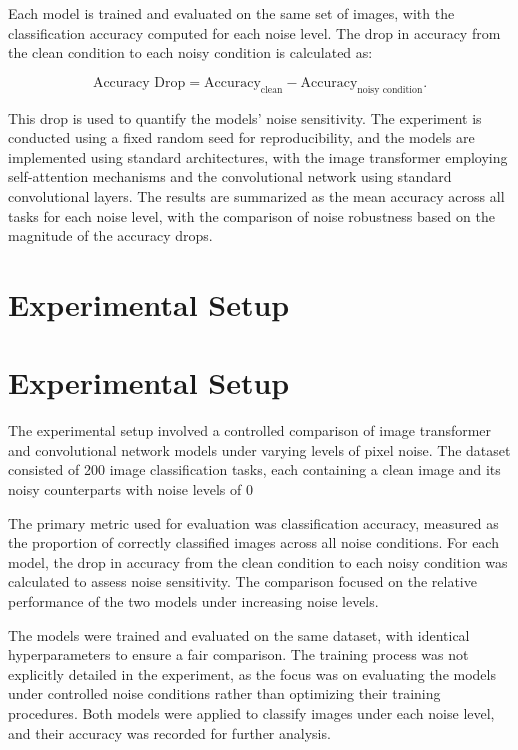 \documentclass{article}
\begin{document}
Each model is trained and evaluated on the same set of images, with the classification accuracy computed for each noise level. The drop in accuracy from the clean condition to each noisy condition is calculated as:

$$
\text{Accuracy Drop} = \text{Accuracy}_{\text{clean}} - \text{Accuracy}_{\text{noisy condition}}.
$$

This drop is used to quantify the models' noise sensitivity. The experiment is conducted using a fixed random seed for reproducibility, and the models are implemented using standard architectures, with the image transformer employing self-attention mechanisms and the convolutional network using standard convolutional layers. The results are summarized as the mean accuracy across all tasks for each noise level, with the comparison of noise robustness based on the magnitude of the accuracy drops.
\section{Experimental Setup}
\section{Experimental Setup}

The experimental setup involved a controlled comparison of image transformer and convolutional network models under varying levels of pixel noise. The dataset consisted of 200 image classification tasks, each containing a clean image and its noisy counterparts with noise levels of 0%

The primary metric used for evaluation was classification accuracy, measured as the proportion of correctly classified images across all noise conditions. For each model, the drop in accuracy from the clean condition to each noisy condition was calculated to assess noise sensitivity. The comparison focused on the relative performance of the two models under increasing noise levels.

The models were trained and evaluated on the same dataset, with identical hyperparameters to ensure a fair comparison. The training process was not explicitly detailed in the experiment, as the focus was on evaluating the models under controlled noise conditions rather than optimizing their training procedures. Both models were applied to classify images under each noise level, and their accuracy was recorded for further analysis.
\end{document}
